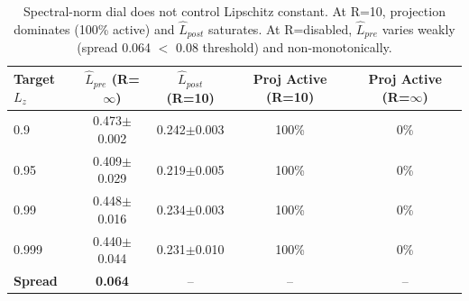 \begin{table}[h]
\centering
\caption{Spectral-norm dial does not control Lipschitz constant. At R=10, projection dominates (100\% active) and $\hat{L}_{post}$ saturates. At R=disabled, $\hat{L}_{pre}$ varies weakly (spread 0.064 $<$ 0.08 threshold) and non-monotonically.}
\label{tab:exp2_dial_failure}
\begin{tabular}{lcccc}
\toprule
Target $L_z$ & $\hat{L}_{pre}$ (R=$\infty$) & $\hat{L}_{post}$ (R=10) & Proj Active (R=10) & Proj Active (R=$\infty$) \\
\midrule
  0.9 & 0.473$\pm$0.002 & 0.242$\pm$0.003 & 100\% & 0\% \\
  0.95 & 0.409$\pm$0.029 & 0.219$\pm$0.005 & 100\% & 0\% \\
  0.99 & 0.448$\pm$0.016 & 0.234$\pm$0.003 & 100\% & 0\% \\
  0.999 & 0.440$\pm$0.044 & 0.231$\pm$0.010 & 100\% & 0\% \\
\midrule
  \textbf{Spread} & \textbf{0.064} & -- & -- & -- \\
\bottomrule
\end{tabular}
\end{table}